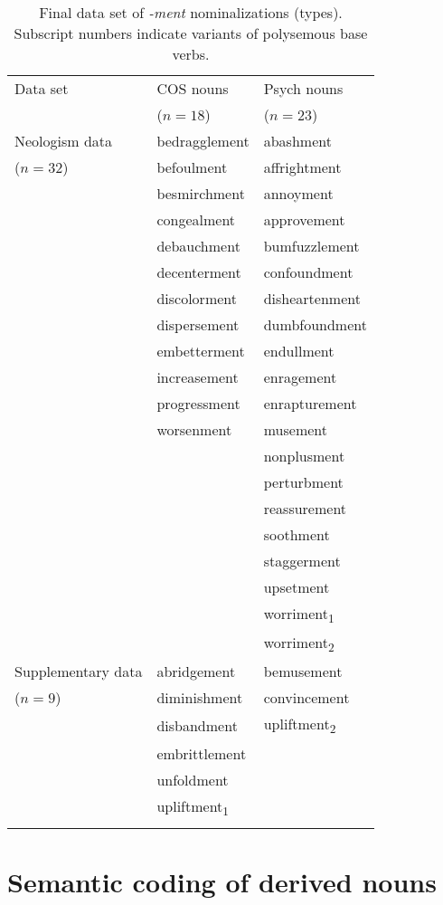 \begin{table}
	\centering 
	\caption[Final data set of \textit{-ment} nominalizations (types)]{Final data set of \textit{-ment} nominalizations (types). Subscript numbers indicate variants of polysemous base verbs.} \label{tab:data set}
	\begin{tabular}{lll}
\lsptoprule
Data set & COS nouns & Psych nouns \\
&($n=18$)&($n=23$)\\
\midrule
Neologism data & {bedragglement} & {abashment} \\
($n=32$) & {befoulment} & {affrightment} \\
& {besmirchment} & {annoyment} \\
& {congealment} & {approvement} \\
& {debauchment} & {bumfuzzlement} \\
& {decenterment} & {confoundment} \\
& {discolorment} & {disheartenment} \\
& {dispersement} & {dumbfoundment} \\
& {embetterment} & {endullment} \\
& {increasement} & {enragement} \\ 
& {progressment} & {enrapturement}\\
& {worsenment} & {musement} \\
& & {nonplusment}\\
& & {perturbment} \\
& & {reassurement} \\
& & {soothment} \\
& & {staggerment} \\
& & {upsetment}\\
& & {worriment}\textsubscript{1}\\
& & {worriment}\textsubscript{2}\\
Supplementary data & {abridgement} & {bemusement}\\
($n=9$) & {diminishment} & {convincement} \\
 & {disbandment} & {upliftment}\textsubscript{2} \\
& {embrittlement} & \\
& {unfoldment} & \\
& {upliftment}\textsubscript{1} & \\
\lspbottomrule
	\end{tabular}%
\end{table}%

\section{Semantic coding of derived nouns}
\label{sec:meth-Nsem}

